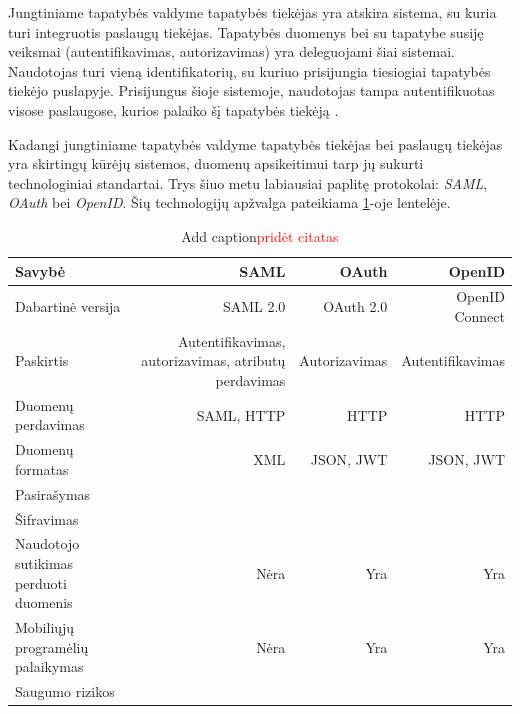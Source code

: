 Jungtiniame tapatybės valdyme tapatybės tiekėjas yra atskira sistema, su kuria turi integruotis paslaugų tiekėjas. Tapatybės
duomenys bei su tapatybe susiję veiksmai (autentifikavimas, autorizavimas) yra deleguojami šiai sistemai. Naudotojas turi vieną identifikatorių,
su kuriuo prisijungia tiesiogiai tapatybės tiekėjo puslapyje. Prisijungus šioje sistemoje, naudotojas tampa
autentifikuotas visose paslaugose, kurios palaiko šį tapatybės tiekėją \cite{Maler2008}.


Kadangi jungtiniame tapatybės valdyme tapatybės tiekėjas bei paslaugų tiekėjas yra skirtingų kūrėjų sistemos,
duomenų apsikeitimui tarp jų sukurti technologiniai standartai. Trys šiuo metu labiausiai paplitę protokolai: \textit{SAML}, \textit{OAuth} bei \textit{OpenID}. Šių technologijų
apžvalga pateikiama \ref{tab:SSOprotocols}-oje lentelėje.

\begin{table}[htbp]
    \centering
    \caption{Add caption\textcolor{red}{pridėt citatas}}
      \begin{tabular}{|p{10.22em}|r|r|r|}
      \hline
      Savybė & \multicolumn{1}{p{12.22em}|}{SAML} & \multicolumn{1}{p{6.945em}|}{OAuth} & \multicolumn{1}{p{8.78em}|}{OpenID} \bigstrut\\
      \hline
      Dabartinė versija & \multicolumn{1}{p{12.22em}|}{SAML 2.0} & \multicolumn{1}{p{6.945em}|}{OAuth 2.0} & \multicolumn{1}{p{8.78em}|}{OpenID Connect} \bigstrut\\
      \hline
      Paskirtis & \multicolumn{1}{p{12.22em}|}{Autentifikavimas, autorizavimas, atributų perdavimas} & \multicolumn{1}{p{6.945em}|}{Autorizavimas} & \multicolumn{1}{p{8.78em}|}{Autentifikavimas} \bigstrut\\
      \hline
      Duomenų perdavimas & \multicolumn{1}{p{12.22em}|}{SAML, HTTP} & \multicolumn{1}{p{6.945em}|}{HTTP} & \multicolumn{1}{p{8.78em}|}{HTTP} \bigstrut\\
      \hline
      Duomenų formatas & \multicolumn{1}{p{12.22em}|}{XML} & \multicolumn{1}{p{6.945em}|}{JSON, JWT} & \multicolumn{1}{p{8.78em}|}{JSON, JWT} \bigstrut\\
      \hline
      Pasirašymas &       &       &  \bigstrut\\
      \hline
      Šifravimas &       &       &  \bigstrut\\
      \hline
      Naudotojo sutikimas perduoti duomenis & \multicolumn{1}{p{12.22em}|}{Nėra} & \multicolumn{1}{p{6.945em}|}{Yra} & \multicolumn{1}{p{8.78em}|}{Yra} \bigstrut\\
      \hline
      Mobiliųjų programėlių palaikymas & \multicolumn{1}{p{12.22em}|}{Nėra} & \multicolumn{1}{p{6.945em}|}{Yra} & \multicolumn{1}{p{8.78em}|}{Yra} \bigstrut\\
      \hline
      Saugumo rizikos &       &       &  \bigstrut\\
      \hline
      \end{tabular}%
    \label{tab:SSOprotocols}%
  \end{table}%


